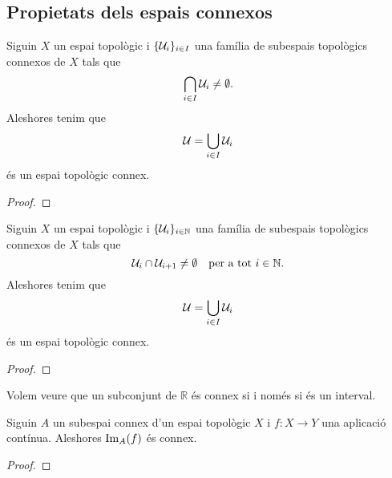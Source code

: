 \documentclass[../Apunts.tex]{subfiles}
\begin{document}
	\subsection{Propietats dels espais connexos}
	\begin{proposition}
		\label{prop:la unió d'una família no disjunta de connexos és connexa}
		Siguin \(X\) un espai topològic i \(\{\mathcal{U}_{i}\}_{i\in I}\) una família de subespais topològics connexos de \(X\) tals que
		\[\bigcap_{i\in I}\mathcal{U}_{i}\neq\emptyset.\]
		Aleshores tenim que
		\[\mathcal{U}=\bigcup_{i\in I}\mathcal{U}_{i}\]
		és un espai topològic connex.
		\begin{proof}
		\end{proof}
	\end{proposition}
	\begin{corollary}
		\label{cor:la unió d'una família numerable de connexos no disjunts dos a dos és connexa}
		Siguin \(X\) un espai topològic i \(\{\mathcal{U}_{i}\}_{i\in\mathbb{N}}\) una família de subespais topològics connexos de \(X\) tals que
		\[\mathcal{U}_{i}\cap\mathcal{U}_{i+1}\neq\emptyset\quad\text{per a tot }i\in\mathbb{N}.\]
		Aleshores tenim que
		\[\mathcal{U}=\bigcup_{i\in I}\mathcal{U}_{i}\]
		és un espai topològic connex.
		\begin{proof}
		\end{proof}
	\end{corollary}
	\begin{example}
		\label{ex:els connexos en R són els intervals}
		Volem veure que un subconjunt de \(\mathbb{R}\) és connex si i només si és un interval.
		\begin{solution}
		\end{solution}
	\end{example}
	\begin{proposition}
		\label{prop:la connexió és conserva per aplicacions contínues}
		Siguin \(A\) un subespai connex d'un espai topològic \(X\) i \(f\colon X\longrightarrow Y\) una aplicació contínua. Aleshores \(\operatorname{Im}_{A}(f)\) és connex.
		\begin{proof}
		\end{proof}
	\end{proposition}
\end{document}
